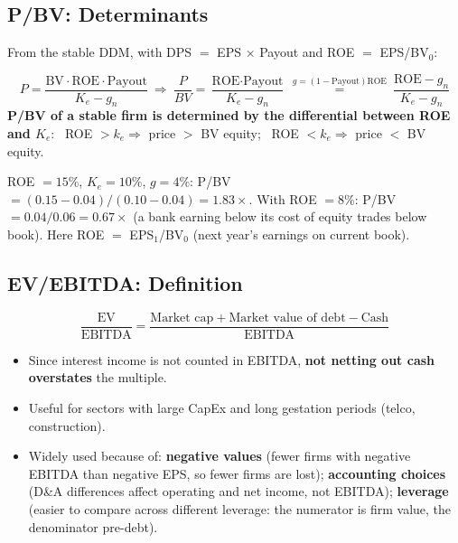 \subsection{P/BV: Determinants}
From the stable DDM, with DPS $=$ EPS $\times$ Payout and ROE $=$ EPS/BV$_0$:
\begin{keybox}
\[
P=\frac{\text{BV}\cdot\text{ROE}\cdot\text{Payout}}{K_e-g_n}\ \Rightarrow\ \frac{P}{BV}=\frac{\text{ROE}\cdot\text{Payout}}{K_e-g_n}\ \overset{g=(1-\text{Payout})\text{ROE}}{=}\ \frac{\text{ROE}-g_n}{K_e-g_n}
\]
\textbf{P/BV of a stable firm is determined by the differential between ROE and $K_e$}: \ ROE $>k_e\Rightarrow$ price $>$ BV equity; \ ROE $<k_e\Rightarrow$ price $<$ BV equity.
\end{keybox}
\begin{exbox}
ROE $=15\%$, $K_e=10\%$, $g=4\%$: P/BV $=(0.15-0.04)/(0.10-0.04)=\mathbf{1.83\times}$. With ROE $=8\%$: P/BV $=0.04/0.06=0.67\times$ (a bank earning below its cost of equity trades below book). Here ROE $=$ EPS$_1$/BV$_0$ (next year's earnings on current book).
\end{exbox}

\subsection{EV/EBITDA: Definition}
\begin{keybox}
\[
\frac{\text{EV}}{\text{EBITDA}}=\frac{\text{Market cap}+\text{Market value of debt}-\text{Cash}}{\text{EBITDA}}
\]
\end{keybox}
\begin{itemize}
  \item Since interest income is not counted in EBITDA, \textbf{not netting out cash overstates} the multiple.
  \item Useful for sectors with large CapEx and long gestation periods (telco, construction).
  \item Widely used because of: \textbf{negative values} (fewer firms with negative EBITDA than negative EPS, so fewer firms are lost); \textbf{accounting choices} (D\&A differences affect operating and net income, not EBITDA); \textbf{leverage} (easier to compare across different leverage: the numerator is firm value, the denominator pre-debt).
\end{itemize}

